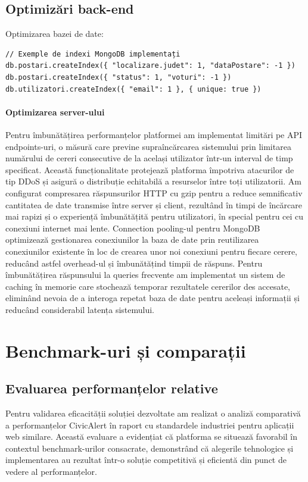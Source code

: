 \documentclass[12pt,a4paper]{report}
\begin{document}
\subsection{Optimizări back-end}

Optimizarea bazei de date:
\begin{verbatim}
// Exemple de indexi MongoDB implementați
db.postari.createIndex({ "localizare.judet": 1, "dataPostare": -1 })
db.postari.createIndex({ "status": 1, "voturi": -1 })
db.utilizatori.createIndex({ "email": 1 }, { unique: true })
\end{verbatim}

\paragraph{Optimizarea server-ului}
Pentru îmbunătățirea performanțelor platformei am implementat limitări pe API endpoints-uri, o măsură care previne supraîncărcarea sistemului prin limitarea numărului de cereri consecutive de la același utilizator într-un interval de timp specificat. Această funcționalitate protejează platforma împotriva atacurilor de tip DDoS și asigură o distribuție echitabilă a resurselor între toți utilizatorii.
Am configurat compresarea răspunsurilor HTTP cu gzip pentru a reduce semnificativ cantitatea de date transmise între server și client, rezultând în timpi de încărcare mai rapizi și o experiență îmbunătățită pentru utilizatori, în special pentru cei cu conexiuni internet mai lente. Connection pooling-ul pentru MongoDB optimizează gestionarea conexiunilor la baza de date prin reutilizarea conexiunilor existente în loc de crearea unor noi conexiuni pentru fiecare cerere, reducând astfel overhead-ul și îmbunătățind timpii de răspuns.
Pentru îmbunătățirea răspunsului la queries frecvente am implementat un sistem de caching în memorie care stochează temporar rezultatele cererilor des accesate, eliminând nevoia de a interoga repetat baza de date pentru aceleași informații și reducând considerabil latența sistemului.

\section{Benchmark-uri și comparații}
\subsection{Evaluarea performanțelor relative}
Pentru validarea eficacității soluției dezvoltate am realizat o analiză comparativă a performanțelor CivicAlert în raport cu standardele industriei pentru aplicații web similare. Această evaluare a evidențiat că platforma se situează favorabil în contextul benchmark-urilor consacrate, demonstrând că alegerile tehnologice și implementarea au rezultat într-o soluție competitivă și eficientă din punct de vedere al performanțelor.
\end{document}
